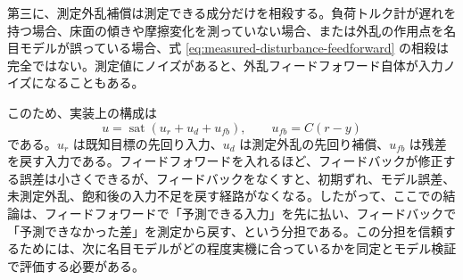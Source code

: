 第三に、測定外乱補償は測定できる成分だけを相殺する。負荷トルク計が遅れを持つ場合、床面の傾きや摩擦変化を測っていない場合、または外乱の作用点を名目モデルが誤っている場合、式 \eqref{eq:measured-disturbance-feedforward} の相殺は完全ではない。測定値にノイズがあると、外乱フィードフォワード自体が入力ノイズになることもある。

このため、実装上の構成は
\begin{equation}
  u
  =
  \operatorname{sat}
  \left(
    u_r+u_d+u_{fb}
  \right),
  \qquad
  u_{fb}=C(r-y)
  \label{eq:feedforward-feedback-implementation}
\end{equation}
である。$u_r$ は既知目標の先回り入力、$u_d$ は測定外乱の先回り補償、$u_{fb}$ は残差を戻す入力である。フィードフォワードを入れるほど、フィードバックが修正する誤差は小さくできるが、フィードバックをなくすと、初期ずれ、モデル誤差、未測定外乱、飽和後の入力不足を戻す経路がなくなる。したがって、ここでの結論は、フィードフォワードで「予測できる入力」を先に払い、フィードバックで「予測できなかった差」を測定から戻す、という分担である。この分担を信頼するためには、次に名目モデルがどの程度実機に合っているかを同定とモデル検証で評価する必要がある。
